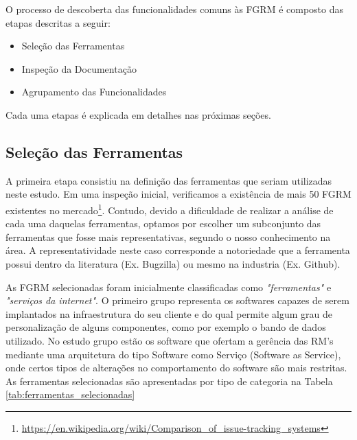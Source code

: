 O processo de descoberta das funcionalidades comuns às FGRM é composto das etapas descritas a
seguir:

\begin{itemize}
	\item Seleção das Ferramentas
	\item Inspeção da Documentação
	\item Agrupamento das Funcionalidades
\end{itemize}

Cada uma etapas é explicada em detalhes nas próximas seções. 

\subsection{Seleção das Ferramentas}
\label{ssub:Seleção das Ferramentas}

A primeira etapa consistiu na definição das ferramentas que seriam utilizadas neste estudo. Em uma
inspeção inicial, verificamos a existência de mais 50 FGRM existentes no
mercado\footnote{\url{https://en.wikipedia.org/wiki/Comparison_of_issue-tracking_systems}}. Contudo,
devido a dificuldade de realizar a análise de cada uma daquelas ferramentas, optamos por escolher um
subconjunto das ferramentas que fosse mais representativas, segundo o nosso conhecimento na área. A
representatividade neste caso corresponde a notoriedade que a ferramenta possui dentro da literatura
(Ex. Bugzilla) ou mesmo na industria (Ex. Github).

As FGRM selecionadas foram inicialmente classificadas como \textit{"ferramentas"} e
\textit{"serviços da internet"}. O primeiro grupo representa os softwares capazes de serem implantados
na infraestrutura do seu cliente e do qual permite algum grau de personalização de alguns
componentes, como por exemplo o bando de dados utilizado. No estudo grupo estão os software que
ofertam a gerência das RM's mediante uma arquitetura do tipo Software como Serviço (Software as
Service), onde certos tipos de alterações no comportamento do software são mais restritas. As
ferramentas selecionadas são apresentadas por tipo de categoria na Tabela
\ref{tab:ferramentas_selecionadas}

